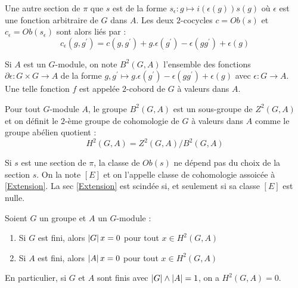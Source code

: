 \documentclass{cours}
\begin{document}
Une autre section de $\pi$ que $s$ est de la forme $s_{\epsilon} : g \mapsto i(\epsilon(g))s(g)$ où $\epsilon$ est une fonction arbitraire de $G$ dans $A$. Les deux $2$-cocycles $c = Ob(s)$ et $c_{\epsilon} = Ob(s_{\epsilon})$ sont alors liés par :
\[
    c_{\epsilon}(g, g^{'}) = c(g, g^{'}) + g.\epsilon(g^{'}) - \epsilon(gg^{'}) + \epsilon(g)
\]

\begin{definition}
    Si $A$ est un $G$-module, on note $B^{2}(G, A)$ l'ensemble des fonctions $\partial\epsilon : G \times G \rightarrow A$ de la forme $g, g^{'} \mapsto g.\epsilon(g^{'}) - \epsilon(gg^{'}) + \epsilon(g)$ avec $\epsilon : G\rightarrow A$. Une telle fonction $f$ est appelée $2$-cobord de $G$ à valeurs dans $A$.
\end{definition}

\begin{definition}
    Pour tout $G$-module $A$, le groupe $B^{2}(G, A)$ est un sous-groupe de $Z^{2}(G, A)$ et on définit le $2$-ème groupe de cohomologie de $G$ à valeurs dans $A$ comme le groupe abélien quotient :
    \[
        H^{2}(G, A) = Z^{2}(G, A)/B^{2}(G, A)
    \]
\end{definition}

\begin{proposition}
    Si $s$ est une section de $\pi$, la classe de $Ob(s)$ ne dépend pas du choix de la section $s$. On la note $\left[E\right]$ et on l'appelle classe de cohomologie assoicée à \ref{Extension}. La sec \ref{Extension} est scindée si, et seulement si sa classe $\left[E\right]$ est nulle.
\end{proposition}

\begin{theorem}
    Soient $G$ un groupe et $A$ un $G$-module :
    \begin{enumerate}
        \item Si $G$ est fini, alors $\left|G\right|x = 0$ pour tout $x \in H^{2}(G, A)$
        \item Si $A$ est fini, alors $\left|A\right|x = 0$ pour tout $x \in H^{2}(G, A)$
    \end{enumerate}
    En particulier, si $G$ et $A$ sont finis avec $\left|G\right| \wedge \left|A\right| = 1$, on a $H^{2}(G, A) = 0$.
\end{theorem}
\end{document}
